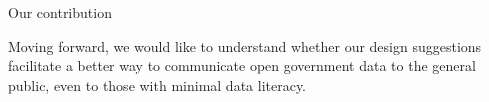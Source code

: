 \documentclass{sigchi}
\begin{document}
Our contribution

Moving forward, we would like to understand whether our design suggestions facilitate a better way to communicate open government data to the general public, even to those with minimal data literacy. 

\end{document}
